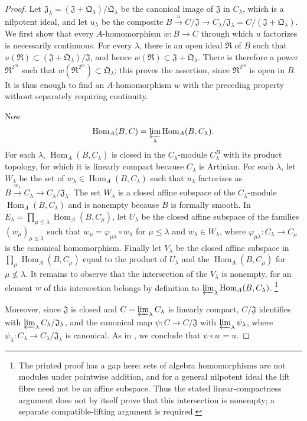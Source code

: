 \begin{proof}
Let $\mathfrak{J}_\lambda=(\mathfrak{J}+\mathfrak{Q}_\lambda)/\mathfrak{Q}_\lambda$
be the canonical image of $\mathfrak{J}$ in $C_\lambda$, which is a nilpotent
ideal, and let $u_\lambda$ be the composite
$B\xrightarrow{u}C/\mathfrak{J}\to C_\lambda/\mathfrak{J}_\lambda
=C/(\mathfrak{J}+\mathfrak{Q}_\lambda)$. We first show that every
$A$-homomorphism $w:B\to C$ through which $u$ factorizes is necessarily
continuous. For every $\lambda$, there is an open ideal $\mathfrak{R}$ of $B$
such that
$u(\mathfrak{R})\subset(\mathfrak{J}+\mathfrak{Q}_\lambda)/\mathfrak{J}$,
and hence $w(\mathfrak{R})\subset\mathfrak{J}+\mathfrak{Q}_\lambda$. There is
therefore a power $\mathfrak{R}^{2^m}$ such that
$w(\mathfrak{R}^{2^m})\subset\mathfrak{Q}_\lambda$; this proves the assertion,
since $\mathfrak{R}^{2^m}$ is open in $B$. It is thus enough to find an
$A$-homomorphism $w$ with the preceding property without separately requiring
continuity.

Now
\[
  \operatorname{Hom}_A(B,C)
  =\varprojlim_\lambda\operatorname{Hom}_A(B,C_\lambda).
\]
For each $\lambda$, $\operatorname{Hom}_A(B,C_\lambda)$ is closed in the
$C_\lambda$-module $C_\lambda^B$ with its product topology, for which it is
linearly compact because $C_\lambda$ is Artinian. For each $\lambda$, let
$W_\lambda$
be the set of $w_\lambda\in\operatorname{Hom}_A(B,C_\lambda)$ such that
$u_\lambda$ factorizes as
$B\xrightarrow{w_\lambda}C_\lambda\to C_\lambda/\mathfrak{J}_\lambda$.
The set $W_\lambda$ is a closed affine subspace of the $C_\lambda$-module
$\operatorname{Hom}_A(B,C_\lambda)$ and is nonempty because $B$ is formally
smooth. In
$E_\lambda=\prod_{\mu\leq\lambda}\operatorname{Hom}_A(B,C_\mu)$, let
$U_\lambda$ be the closed affine subspace of the families
$(w_\mu)_{\mu\leq\lambda}$ such that
$w_\mu=\varphi_{\mu\lambda}\circ w_\lambda$ for $\mu\leq\lambda$ and
$w_\lambda\in W_\lambda$, where
$\varphi_{\mu\lambda}:C_\lambda\to C_\mu$ is the canonical homomorphism.
Finally let $V_\lambda$ be the closed affine subspace in
$\prod_\mu\operatorname{Hom}_A(B,C_\mu)$ equal to the product of $U_\lambda$
and the $\operatorname{Hom}_A(B,C_\mu)$ for $\mu\not\leq\lambda$. It remains to
observe that the intersection of the $V_\lambda$ is nonempty, for an element
$w$ of this intersection belongs by definition to
$\varprojlim_\lambda\operatorname{Hom}_A(B,C_\lambda)$.
\footnote{The printed proof has a gap here: sets of algebra homomorphisms are
not modules under pointwise addition, and for a general nilpotent ideal the
lift fibre need not be an affine subspace. Thus the stated linear-compactness
argument does not by itself prove that this intersection is nonempty; a
separate compatible-lifting argument is required.}

Moreover, since $\mathfrak{J}$ is closed and
$C=\varprojlim_\lambda C_\lambda$ is linearly compact,
$C/\mathfrak{J}$ identifies with
$\varprojlim_\lambda C_\lambda/\mathfrak{J}_\lambda$, and the canonical map
$\psi:C\to C/\mathfrak{J}$ with $\varprojlim_\lambda\psi_\lambda$, where
$\psi_\lambda:C_\lambda\to C_\lambda/\mathfrak{J}_\lambda$ is canonical.
As in , we conclude that $\psi\circ w=u$.
\end{proof}

